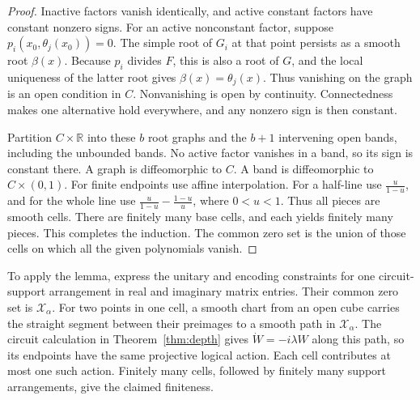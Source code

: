 \documentclass[aps,prl,reprint,notitlepage,nofootinbib,nobibnotes]{revtex4-2}
\begin{document}
\begin{proof}
Inactive factors vanish identically, and active constant factors have
constant nonzero signs. For an active nonconstant factor, suppose
\(p_i(x_0,\theta_j(x_0))=0\).
The simple root of \(G_i\) at that point persists as a smooth root
\(\beta(x)\). Because \(p_i\) divides \(F\), this is also a root of
\(G\), and the local uniqueness of the latter root gives
\(\beta(x)=\theta_j(x)\). Thus vanishing on the graph is an open
condition in \(C\). Nonvanishing is open by continuity. Connectedness
makes one alternative hold everywhere, and any nonzero sign is then
constant.

Partition \(C\times\mathbb R\) into these \(b\) root graphs and the
\(b+1\) intervening open bands, including the unbounded bands.
No active factor vanishes in a band, so its sign is constant there.
A graph is diffeomorphic to \(C\). A band is diffeomorphic to
\(C\times(0,1)\). For finite endpoints use affine interpolation.
For a half-line use \(\frac{u}{1-u}\), and for the whole line use
\(\frac{u}{1-u}-\frac{1-u}{u}\), where \(0<u<1\).
Thus all pieces are smooth cells. There are finitely many base cells,
and each yields finitely many pieces. This completes the induction. The common zero set is the union of those cells on which
all the given polynomials vanish.
\end{proof}

To apply the lemma, express the unitary and encoding constraints
for one circuit-support arrangement in real and imaginary matrix
entries. Their common zero set is \(\mathcal X_\alpha\).
For two points in one cell, a smooth chart from an open cube carries
the straight segment between their preimages to a smooth path in
\(\mathcal X_\alpha\). The circuit calculation in Theorem~\ref{thm:depth}
gives \(\dot W=-i\lambda W\) along this path, so its endpoints have the
same projective logical action. Each cell contributes at most one such
action. Finitely many cells, followed by finitely many support
arrangements, give the claimed finiteness.
\end{document}
